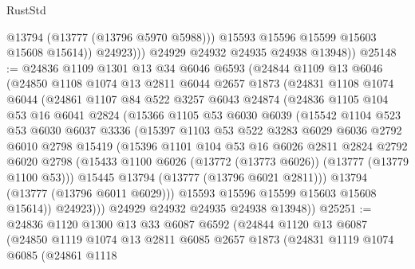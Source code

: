 \begin{lexlean}{RustStd}
\begin{coremodule}
                    @13794
                    (@13777 (@13796 @5970 @5988)))
                  @15593
                  @15596
                  @15599
                  @15603
                  @15608
                  @15614))
              @24923)))
        @24929
        @24932
        @24935
        @24938
        @13948))
@25148 := @24836
    @1109
    @1301
    @13
    @34
    @6046
    @6593
    (@24844
      @1109
      @13
      @6046
      (@24850
        @1108
        @1074
        @13
        @2811
        @6044
        @2657
        @1873
        (@24831
          @1108
          @1074
          @6044
          (@24861
            @1107
            @84
            @522
            @3257
            @6043
            @24874
            (@24836
              @1105
              @104
              @53
              @16
              @6041
              @2824
              (@15366
                @1105
                @53
                @6030
                @6039
                (@15542
                  @1104
                  @523
                  @53
                  @6030
                  @6037
                  @3336
                  (@15397
                    @1103
                    @53
                    @522
                    @3283
                    @6029
                    @6036
                    @2792
                    @6010
                    @2798
                    @15419
                    (@15396
                      @1101
                      @104
                      @53
                      @16
                      @6026
                      @2811
                      @2824
                      @2792
                      @6020
                      @2798
                      (@15433 @1100 @6026 (@13772 (@13773 @6026)) (@13777 (@13779 @1100 @53)))
                      @15445
                      @13794
                      (@13777 (@13796 @6021 @2811)))
                    @13794
                    (@13777 (@13796 @6011 @6029)))
                  @15593
                  @15596
                  @15599
                  @15603
                  @15608
                  @15614))
              @24923)))
        @24929
        @24932
        @24935
        @24938
        @13948))
@25251 := @24836
    @1120
    @1300
    @13
    @33
    @6087
    @6592
    (@24844
      @1120
      @13
      @6087
      (@24850
        @1119
        @1074
        @13
        @2811
        @6085
        @2657
        @1873
        (@24831
          @1119
          @1074
          @6085
          (@24861
            @1118

\end{coremodule}
\end{lexlean}
